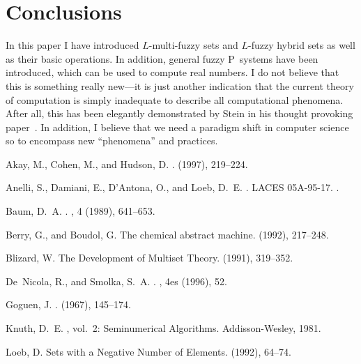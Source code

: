 \documentclass{amsart}
\theoremstyle{definition}
\begin{document}
\section{Conclusions}
In this paper I have introduced $L$-multi-fuzzy sets and $L$-fuzzy hybrid sets as well as
their basic operations. In addition, general fuzzy P~systems have been introduced, which 
can be used to compute real numbers. I do not believe that this is something really new---it 
is just another indication that the current theory of computation is simply inadequate to describe 
all computational phenomena. After all, this has been elegantly demonstrated by Stein in his 
thought provoking paper~\cite{stein99}. In addition, I believe that we need a paradigm shift in 
computer science so to encompass new ``phenomena'' and practices. 
\begin{thebibliography}{10}

{\sc Akay, M., Cohen, M., and Hudson, D.}
.
 (1997), 219--224.

{\sc Anelli, S., Damiani, E., D'Antona, O., and Loeb, D.~E.}
.
\newblock LACES 05A-95-17.
.

{\sc Baum, D.~A.}
.
, 4 (1989), 641--653.

{\sc Berry, G., and Boudol, G.}
\newblock The chemical abstract machine.
 (1992), 217--248.

{\sc Blizard, W.}
\newblock The {D}evelopment of {M}ultiset {T}heory.
 (1991), 319--352.

{\sc De~Nicola, R., and Smolka, S.~A.}
.
, 4es (1996), 52.

{\sc Goguen, J.}
.
 (1967),
  145--174.

{\sc Knuth, D.~E.}
, vol.~2: {S}eminumerical
  {A}lgorithms.
\newblock Addisson-Wesley, 1981.

{\sc Loeb, D.}
\newblock Sets with a {N}egative {N}umber of {E}lements.
 (1992), 64--74.


\end{thebibliography}
\end{document}

